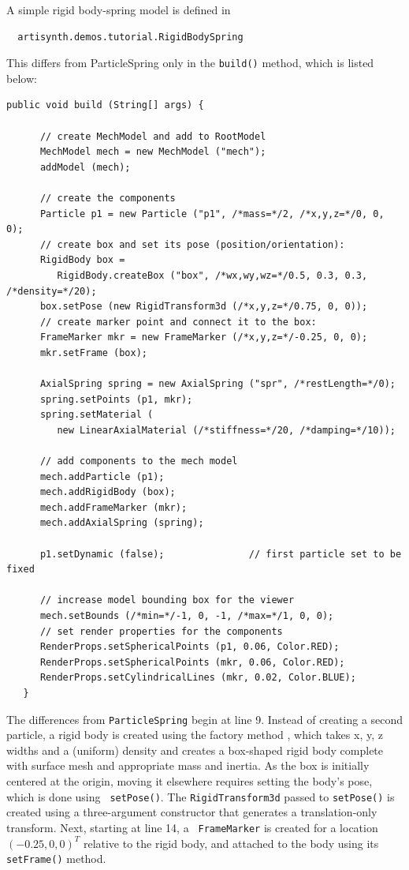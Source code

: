 A simple rigid body-spring model is defined in
%
\begin{verbatim}
  artisynth.demos.tutorial.RigidBodySpring
\end{verbatim}
%
This differs from ParticleSpring only in the {\tt build()} method,
which is listed below:
\lstset{numbers=left}
\begin{lstlisting}[]
   public void build (String[] args) {

      // create MechModel and add to RootModel
      MechModel mech = new MechModel ("mech");
      addModel (mech);

      // create the components
      Particle p1 = new Particle ("p1", /*mass=*/2, /*x,y,z=*/0, 0, 0);
      // create box and set its pose (position/orientation):
      RigidBody box =
         RigidBody.createBox ("box", /*wx,wy,wz=*/0.5, 0.3, 0.3, /*density=*/20);
      box.setPose (new RigidTransform3d (/*x,y,z=*/0.75, 0, 0));
      // create marker point and connect it to the box:
      FrameMarker mkr = new FrameMarker (/*x,y,z=*/-0.25, 0, 0);
      mkr.setFrame (box);

      AxialSpring spring = new AxialSpring ("spr", /*restLength=*/0);
      spring.setPoints (p1, mkr);
      spring.setMaterial (
         new LinearAxialMaterial (/*stiffness=*/20, /*damping=*/10));

      // add components to the mech model
      mech.addParticle (p1);
      mech.addRigidBody (box);
      mech.addFrameMarker (mkr);
      mech.addAxialSpring (spring);

      p1.setDynamic (false);               // first particle set to be fixed

      // increase model bounding box for the viewer
      mech.setBounds (/*min=*/-1, 0, -1, /*max=*/1, 0, 0);  
      // set render properties for the components
      RenderProps.setSphericalPoints (p1, 0.06, Color.RED);
      RenderProps.setSphericalPoints (mkr, 0.06, Color.RED);
      RenderProps.setCylindricalLines (mkr, 0.02, Color.BLUE);
   }
\end{lstlisting}
\lstset{numbers=none} 
The differences from {\tt ParticleSpring} begin
at line 9. Instead of creating a second particle, a rigid body is
created using the factory method
, which
takes x, y, z widths and a (uniform) density and creates a box-shaped
rigid body complete with surface mesh and appropriate mass and
inertia. As the box is initially centered at the origin, moving it
elsewhere requires setting the body's pose, which is done using {\tt
setPose()}. The {\tt RigidTransform3d} passed to {\tt setPose()} is
created using a three-argument constructor that generates a
translation-only transform.  Next, starting at line 14, a {\tt
FrameMarker} is created for a location $(-0.25, 0, 0)^T$ relative to the
rigid body, and attached to the body using its {\tt setFrame()}
method.

